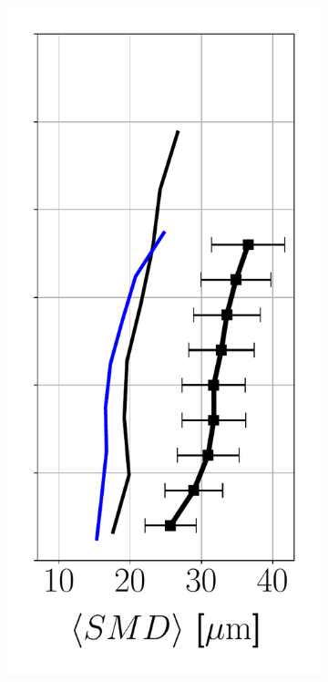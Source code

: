 \begin{figure}[ht]
\begin{subfigure}[b]{0.2\textwidth}
   \includegraphics[scale=0.35]{./part2_developments/figures_ch6_lagrangian_JICF/params_quadtrees/profiles/SMD_along_z}
\end{subfigure}
\hspace*{0.1in}

\end{figure}
